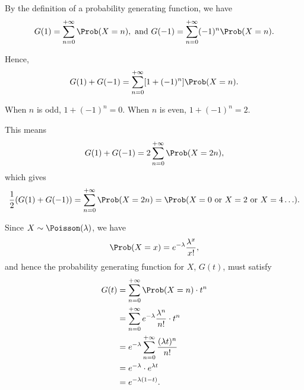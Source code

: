 \Question{\currfilebase}

By the definition of a probability generating function, we have
\[
    G(1) = \sum_{n = 0}^{+\infty} \Prob(X = n), \text{ and } G(-1) = \sum_{n = 0}^{+\infty} (-1)^n \Prob(X = n).
\]

Hence,
\[
    G(1) + G(-1) = \sum_{n = 0}^{+\infty} [1 + (-1)^n] \Prob(X = n).
\]

When \(n\) is odd, \(1 + (-1)^n = 0\). When \(n\) is even, \(1 + (-1)^n = 2\).

This means
\[
    G(1) + G(-1) = 2 \sum_{n = 0}^{+\infty} \Prob(X = 2n),
\]
which gives
\[
    \frac{1}{2} (G(1) + G(-1)) = \sum_{n = 0}^{+\infty} \Prob(X = 2n) = \Prob(X = 0 \text{ or } X = 2 \text{ or } X = 4 \ldots).
\]

Since \(X \sim \Poisson(\lambda)\), we have
\[
    \Prob(X = x) = e^{-\lambda} \frac{\lambda^x}{x!},
\]
and hence the probability generating function for \(X\), \(G(t)\), must satisfy
\begin{align*}
    G(t) & = \sum_{n = 0}^{+\infty} \Prob(X = n) \cdot t^n                      \\
         & = \sum_{n = 0}^{+\infty} e^{-\lambda} \frac{\lambda^n}{n!} \cdot t^n \\
         & = e^{-\lambda} \sum_{n = 0}^{+\infty} \frac{(\lambda t)^n}{n!}       \\
         & = e^{-\lambda} \cdot e^{\lambda t}                                   \\
         & = e^{-\lambda (1 - t)}.
\end{align*}

